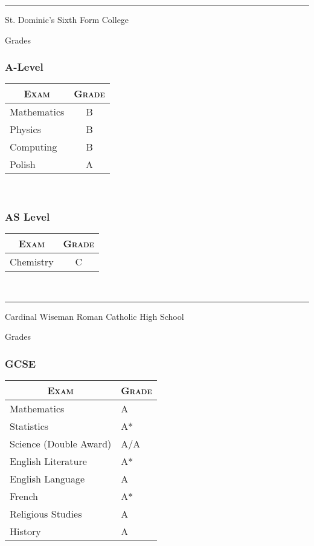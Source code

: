 \documentclass[a4paper,10pt]{article}
\begin{document}
\bigskip \hrule \bigskip
\par{\centering\Large \hypertarget{doms}{St. Dominic's Sixth Form
    College}\par}\large{\centering Grades\par}\normalsize
\begin{center}
  \subsubsection{A-Level}
  \begin{tabular}{lc}
    \multicolumn{1}{c}{\textsc{Exam}}&\textsc{Grade}\\ \hline
    Mathematics & B\\
    Physics	&B\\
    Computing&B\\
    Polish& A
  \end{tabular}\\
\end{center}
\begin{center}
  \subsubsection{AS Level}
  \begin{tabular}{lc}
    \multicolumn{1}{c}{\textsc{Exam}}&\textsc{Grade}\\ \hline
    Chemistry& C\\
  \end{tabular}\\
\end{center}\newpage
\bigskip \hrule \bigskip
\par{\centering\Large \hypertarget{wise}{Cardinal Wiseman Roman
    Catholic High School}\par}\large{\centering Grades\par}\normalsize
\begin{center}
  \subsubsection{GCSE}
  \begin{tabular}{ll}
    \multicolumn{1}{c}{\textsc{Exam}}&\textsc{Grade}\\ \hline
    Mathematics&A\\
    Statistics&A*\\
    Science (Double Award)& A/A\\
    English Literature&A*\\
    English Language& A\\
    French& A*\\
    Religious Studies& A\\
    History&A
  \end{tabular}
\end{center}
\end{document}
